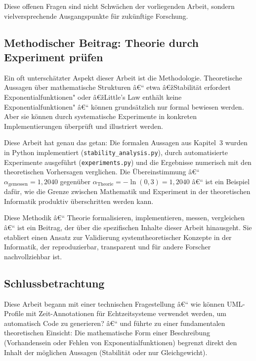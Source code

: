 ﻿\documentclass[a4paper,12pt]{report}
\theoremstyle{definition}
\begin{document}
Diese offenen Fragen sind nicht Schwächen der vorliegenden Arbeit, sondern
vielversprechende Ausgangspunkte für zukünftige Forschung.

\subsection{Methodischer Beitrag: Theorie durch Experiment prüfen}

Ein oft unterschätzter Aspekt dieser Arbeit ist die Methodologie.
Theoretische Aussagen über mathematische Strukturen â€“ etwa â€žStabilität
erfordert Exponentialfunktionen" oder â€žLittle's Law enthält keine
Exponentialfunktionen" â€“ können grundsätzlich nur formal bewiesen werden.
Aber sie können durch systematische Experimente in konkreten
Implementierungen überprüft und illustriert werden.

Diese Arbeit hat genau das getan: Die formalen Aussagen aus Kapitel~3 wurden
in Python implementiert (\texttt{stability\_analysis.py}), durch automatisierte
Experimente ausgeführt (\texttt{experiments.py}) und die Ergebnisse numerisch
mit den theoretischen Vorhersagen verglichen.  Die Übereinstimmung â€“
$\alpha_\text{gemessen} = 1{,}2040$ gegenüber $\alpha_\text{Theorie} =
-\ln(0{,}3) = 1{,}2040$ â€“ ist ein Beispiel dafür, wie die Grenze zwischen
Mathematik und Experiment in der theoretischen Informatik produktiv überschritten
werden kann.

Diese Methodik â€“ Theorie formalisieren, implementieren, messen, vergleichen â€“
ist ein Beitrag, der über die spezifischen Inhalte dieser Arbeit hinausgeht.
Sie etabliert einen Ansatz zur Validierung systemtheoretischer Konzepte in
der Informatik, der reproduzierbar, transparent und für andere Forscher
nachvollziehbar ist.

\subsection{Schlussbetrachtung}

Diese Arbeit begann mit einer technischen Fragestellung â€“ wie können
UML-Profile mit Zeit-Annotationen für Echtzeitsysteme verwendet werden,
um automatisch Code zu generieren? â€“ und führte zu einer fundamentalen
theoretischen Einsicht: Die mathematische Form einer Beschreibung
(Vorhandensein oder Fehlen von Exponentialfunktionen) begrenzt direkt
den Inhalt der möglichen Aussagen (Stabilität oder nur Gleichgewicht).
\end{document}
